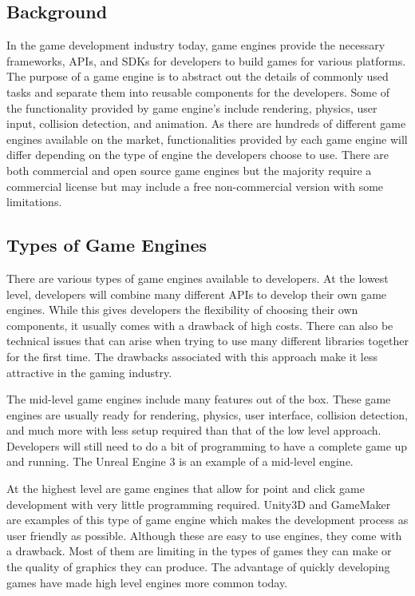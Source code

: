 \subsection{Background}
In the game development industry today, game engines provide the necessary frameworks, APIs, and SDKs for developers to build games for various platforms. The purpose of a game engine is to abstract out the details of commonly used tasks and separate them into reusable components for the developers. Some of the functionality provided by game engine's include rendering, physics, user input, collision detection, and animation. As there are hundreds of different game engines available on the market, functionalities provided by each game engine will differ depending on the type of engine the developers choose to use. There are both commercial and open source game engines but the majority require a commercial license but may include a free non-commercial version with some limitations.

\subsection{Types of Game Engines}
There are various types of game engines available to developers. At the lowest level, developers will combine many different APIs to develop their own game engines. While this gives developers the flexibility of choosing their own components, it usually comes with a drawback of high costs. There can also be technical issues that can arise when trying to use many different libraries together for the first time. The drawbacks associated with this approach make it less attractive in the gaming industry.

The mid-level game engines include many features out of the box. These game engines are usually ready for rendering, physics, user interface, collision detection, and much more with less setup required than that of the low level approach. Developers will still need to do a bit of programming to have a complete game up and running. The Unreal Engine 3 is an example of a mid-level engine.

At the highest level are game engines that allow for point and click game development with very little programming required. Unity3D and GameMaker are examples of this type of game engine which makes the development process as user friendly as possible. Although these are easy to use engines, they come with a drawback. Most of them are limiting in the types of games they can make or the quality of graphics they can produce. The advantage of quickly developing games have made high level engines more common today.
 
